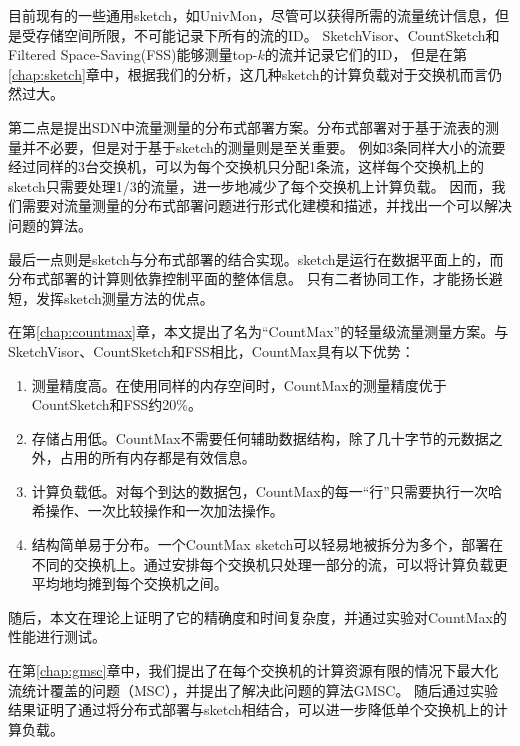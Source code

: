 目前现有的一些通用sketch，如UnivMon\cite{liu2016one}，尽管可以获得所需的流量统计信息，但是受存储空间所限，不可能记录下所有的流的ID。
SketchVisor\cite{huang2017sketchvisor}、CountSketch\cite{charikar2004finding}和Filtered Space-Saving(FSS)\cite{homem2010finding}能够测量top-$k$的流并记录它们的ID，
但是在第\ref{chap:sketch}章中，根据我们的分析，这几种sketch的计算负载对于交换机而言仍然过大。


第二点是提出SDN中流量测量的分布式部署方案。分布式部署对于基于流表的测量并不必要，但是对于基于sketch的测量则是至关重要。
例如3条同样大小的流要经过同样的3台交换机，可以为每个交换机只分配1条流，这样每个交换机上的sketch只需要处理1/3的流量，进一步地减少了每个交换机上计算负载。
因而，我们需要对流量测量的分布式部署问题进行形式化建模和描述，并找出一个可以解决问题的算法。

最后一点则是sketch与分布式部署的结合实现。sketch是运行在数据平面上的，而分布式部署的计算则依靠控制平面的整体信息。
只有二者协同工作，才能扬长避短，发挥sketch测量方法的优点。

在第\ref{chap:countmax}章，本文提出了名为“CountMax”的轻量级流量测量方案。与SketchVisor、CountSketch和FSS相比，CountMax具有以下优势：
\begin{enumerate}
    \item 测量精度高。在使用同样的内存空间时，CountMax的测量精度优于CountSketch和FSS约20\%。
    \item 存储占用低。CountMax不需要任何辅助数据结构，除了几十字节的元数据之外，占用的所有内存都是有效信息。
    \item 计算负载低。对每个到达的数据包，CountMax的每一“行”只需要执行一次哈希操作、一次比较操作和一次加法操作。
    \item 结构简单易于分布。一个CountMax sketch可以轻易地被拆分为多个，部署在不同的交换机上。通过安排每个交换机只处理一部分的流，可以将计算负载更平均地均摊到每个交换机之间。
\end{enumerate}
随后，本文在理论上证明了它的精确度和时间复杂度，并通过实验对CountMax的性能进行测试。

在第\ref{chap:gmsc}章中，我们提出了在每个交换机的计算资源有限的情况下最大化流统计覆盖的问题（MSC），并提出了解决此问题的算法GMSC。
随后通过实验结果证明了通过将分布式部署与sketch相结合，可以进一步降低单个交换机上的计算负载。



